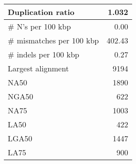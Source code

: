 \documentclass[12pt,a4paper]{article}
\begin{document}
\begin{table}[ht]
\begin{center}
\begin{tabular}{|l*{1}{|r}|}
Duplication ratio & 1.032 \\ \hline
\# N's per 100 kbp & 0.00 \\ \hline
\# mismatches per 100 kbp & 402.43 \\ \hline
\# indels per 100 kbp & 0.27 \\ \hline
Largest alignment & 9194 \\ \hline
NA50 & 1890 \\ \hline
NGA50 & 622 \\ \hline
NA75 & 1003 \\ \hline
LA50 & 422 \\ \hline
LGA50 & 1447 \\ \hline
LA75 & 900 \\ \hline
\end{tabular}
\end{center}
\end{table}
\end{document}
